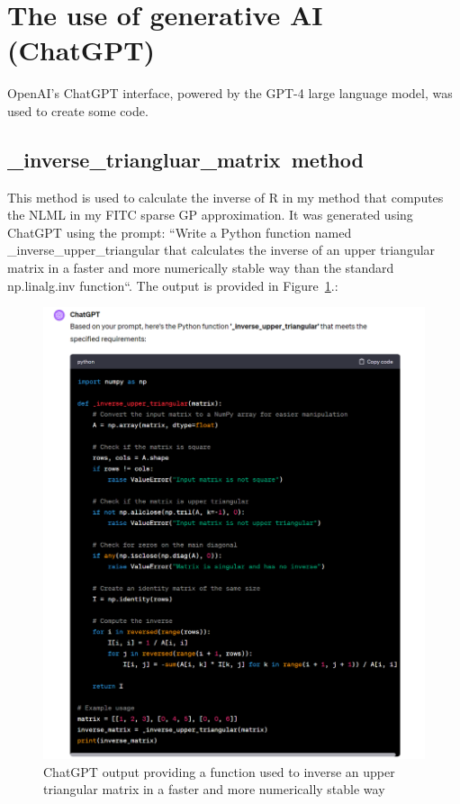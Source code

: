 \appendix
\section{The use of generative AI (ChatGPT)}
OpenAI's ChatGPT interface, powered by the GPT-4 large language model, was used to create some code.
\subsection{\_inverse\_triangluar\_matrix\ method}
This method is used to calculate the inverse of R in my method that computes the NLML in my FITC sparse GP approximation.
It was generated using ChatGPT using the prompt: ``Write a Python function named \_inverse\_upper\_triangular that calculates the inverse of an upper triangular matrix in a faster and more numerically stable way than the standard np.linalg.inv function``.
The output is provided in Figure~\ref{fig:chat-iut}.:
\begin{figure}[htbp]
    \centering
    \includegraphics[width=1\linewidth]{figures/chat-iut/chat-iut.png}
    \caption{ChatGPT output providing a function used to inverse an upper triangular matrix in a faster and more numerically stable way}
    \label{fig:chat-iut}
\end{figure}



